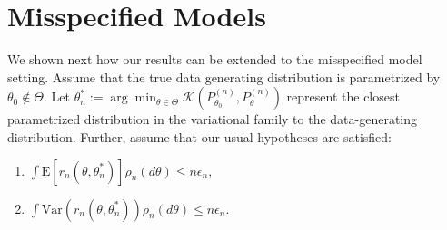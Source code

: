 \documentclass[11pt]{amsart}
\newcommand{\E}{\mathrm{E}}
\newcommand{\Var}{\mathrm{Var}}
\newcommand{\kld}{ \mathcal{K}(P^{(n)}_{\theta_0},P^{(n)}_{\theta})}
\begin{document}
\section{Misspecified Models}
{
We shown next how our results can be extended to the misspecified model setting. 
Assume that the true data generating distribution is parametrized by $\theta_0 \not \in \Theta$. Let $\theta^*_n := \arg \min_{\theta\in \Theta} \kld$ represent the closest parametrized distribution in the variational family to the data-generating distribution. Further, assume that our usual hypotheses are satisfied:
\begin{enumerate}[align=left,leftmargin=*]
    \item $ \int \E[r_n(\theta,\theta^*_n)] \rho_n(d\theta) \leq n\epsilon_n $,
    \item $\int \Var \left( r_n(\theta,\theta^*_n
    ) \right)\rho_n (d\theta)\leq n\epsilon_n$.
\end{enumerate}

}
\end{document}
